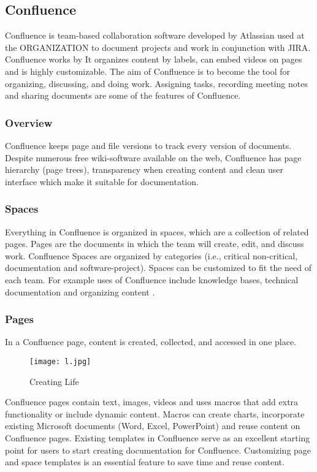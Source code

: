 \subsection {Confluence}
\gls{Confluence} is team-based collaboration software developed by Atlassian used at the ORGANIZATION to document projects and work in conjunction with \gls{JIRA}. Confluence works by It organizes content by labels, can embed videos on pages and is highly customizable. The aim of Confluence is to become the tool for organizing, discussing, and doing work. Assigning tasks, recording meeting notes and sharing documents are some of the features of Confluence.
\subsubsection{Overview}
Confluence keeps page and file versions to track every version of documents. Despite numerous free wiki-software available on the web, Confluence has page hierarchy (page trees), transparency when creating content and clean user interface which make it suitable for documentation.
\subsubsection{Spaces}
Everything in Confluence is organized in spaces, which are a collection of related pages. Pages are the documents in which the team will create, edit, and discuss work. Confluence Spaces are organized by categories (i.e., critical non-critical, documentation and software-project). Spaces can be customized to fit the need of each team. For example uses of Confluence include knowledge bases, technical documentation and organizing content \cite{confluence:Online}.
\subsubsection{Pages}
In a Confluence page, content is created, collected, and accessed in one place.

\begin{figure}
	\centering
	\texttt{[image: l.jpg]}
	\caption{Creating Life}
\end{figure}

\noindent \gls{Confluence} pages contain text, images, videos and uses macros that add extra functionality or include dynamic content. Macros can create charts, incorporate existing Microsoft documents (Word, Excel, PowerPoint) and reuse content on Confluence pages. Existing templates in Confluence serve as an excellent starting point for users to start creating documentation for Confluence. Customizing page and space templates is an essential feature to save time and reuse content.

